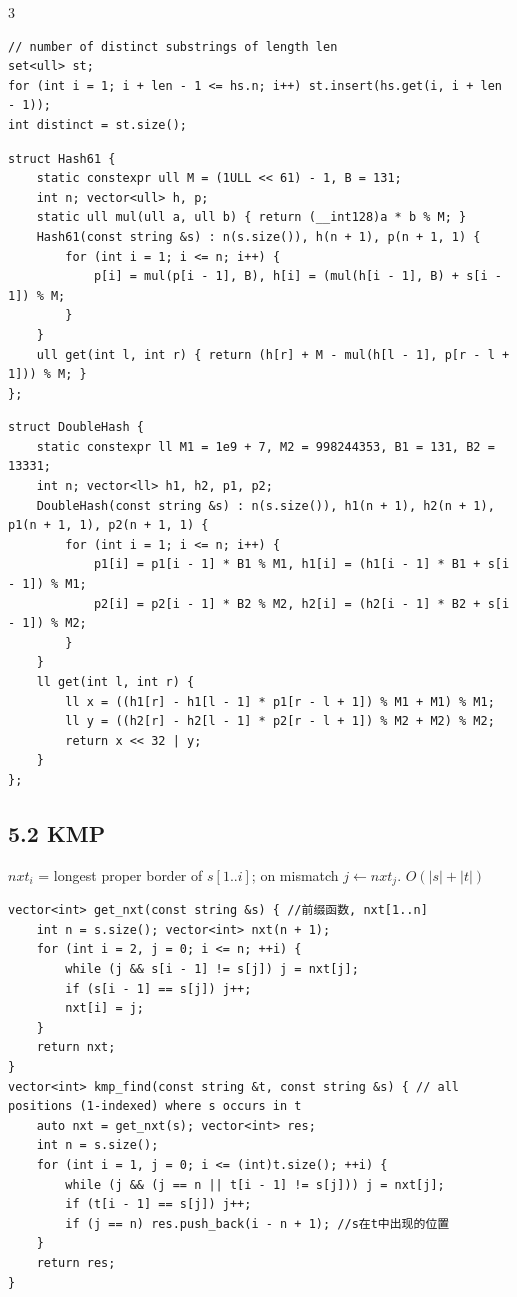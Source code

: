 \documentclass[8pt]{extarticle}
\begin{document}
\begin{multicols*}{3}
\begin{lstlisting}
// number of distinct substrings of length len
set<ull> st;
for (int i = 1; i + len - 1 <= hs.n; i++) st.insert(hs.get(i, i + len - 1));
int distinct = st.size();
\end{lstlisting}

\begin{lstlisting}
struct Hash61 {
    static constexpr ull M = (1ULL << 61) - 1, B = 131;
    int n; vector<ull> h, p;
    static ull mul(ull a, ull b) { return (__int128)a * b % M; }
    Hash61(const string &s) : n(s.size()), h(n + 1), p(n + 1, 1) {
        for (int i = 1; i <= n; i++) {
            p[i] = mul(p[i - 1], B), h[i] = (mul(h[i - 1], B) + s[i - 1]) % M;
        }
    }
    ull get(int l, int r) { return (h[r] + M - mul(h[l - 1], p[r - l + 1])) % M; }
};
\end{lstlisting}

\begin{lstlisting}
struct DoubleHash {
    static constexpr ll M1 = 1e9 + 7, M2 = 998244353, B1 = 131, B2 = 13331;
    int n; vector<ll> h1, h2, p1, p2;
    DoubleHash(const string &s) : n(s.size()), h1(n + 1), h2(n + 1), p1(n + 1, 1), p2(n + 1, 1) {
        for (int i = 1; i <= n; i++) {
            p1[i] = p1[i - 1] * B1 % M1, h1[i] = (h1[i - 1] * B1 + s[i - 1]) % M1;
            p2[i] = p2[i - 1] * B2 % M2, h2[i] = (h2[i - 1] * B2 + s[i - 1]) % M2;
        }
    }
    ll get(int l, int r) {
        ll x = ((h1[r] - h1[l - 1] * p1[r - l + 1]) % M1 + M1) % M1;
        ll y = ((h2[r] - h2[l - 1] * p2[r - l + 1]) % M2 + M2) % M2;
        return x << 32 | y;
    }
};
\end{lstlisting}

\subsection*{5.2 KMP}

$nxt_i$ = longest proper border of $s[1..i]$; on mismatch $j \leftarrow nxt_j$. $O(|s| + |t|)$

\begin{lstlisting}
vector<int> get_nxt(const string &s) { //前缀函数, nxt[1..n]
    int n = s.size(); vector<int> nxt(n + 1);
    for (int i = 2, j = 0; i <= n; ++i) {
        while (j && s[i - 1] != s[j]) j = nxt[j];
        if (s[i - 1] == s[j]) j++;
        nxt[i] = j;
    }
    return nxt;
}
vector<int> kmp_find(const string &t, const string &s) { // all positions (1-indexed) where s occurs in t
    auto nxt = get_nxt(s); vector<int> res;
    int n = s.size();
    for (int i = 1, j = 0; i <= (int)t.size(); ++i) {
        while (j && (j == n || t[i - 1] != s[j])) j = nxt[j];
        if (t[i - 1] == s[j]) j++;
        if (j == n) res.push_back(i - n + 1); //s在t中出现的位置
    }
    return res;
}
\end{lstlisting}


\end{multicols*}
\end{document}
